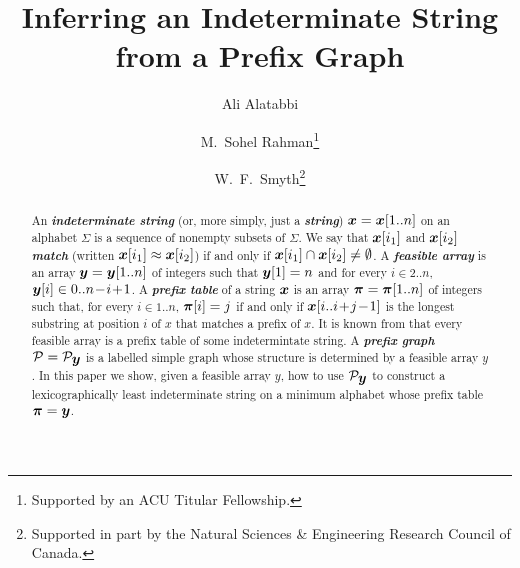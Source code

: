 \documentclass[runningheads,a4paper]{llncs}
\def\s#1{\mbox{\boldmath $#1$}}
\def\+{\!+\!}
\def\-{\!-\!}
\def\itbf#1{\textit{\textbf{#1}}}
\def\match{\approx}
\begin{document}
\pagestyle{headings}


\title {Inferring an Indeterminate String \\ from a Prefix Graph}
 
\author{
Ali Alatabbi
\and
M.\ Sohel Rahman\thanks{Supported by an ACU Titular Fellowship.}
\and
W.\ F.\ Smyth\thanks{Supported in part by the Natural Sciences \& Engineering
Research Council of Canada.}}




\maketitle

\begin{abstract}
An \itbf{indeterminate string} (or, more simply, just a \itbf{string})
$\s{x} = \s{x}[1..n]$ on an alphabet $\Sigma$
is a sequence of nonempty subsets of $\Sigma$.
We say that $\s{x}[i_1]$ and $\s{x}[i_2]$ \itbf{match}
(written $\s{x}[i_1] \match \s{x}[i_2]$) if and only if
$\s{x}[i_1] \cap \s{x}[i_2] \ne \emptyset$.
A \itbf{feasible array} is an array $\s{y} = \s{y}[1..n]$ of integers
such that $\s{y}[1] = n$ and for every $i \in 2..n$,
$\s{y}[i] \in 0..n\- i\+ 1$.
A \itbf{prefix table} of a string $\s{x}$ is an array $\s{\pi} = \s{\pi}[1..n]$
of integers such that, for every $i \in 1..n$,
$\s{\pi}[i] = j$ if and only if $\s{x}[i..i\+ j\- 1]$
is the longest substring at position $i$ of \s{x} that matches a prefix of \s{x}.
It is known from \cite{CRSW13} that every feasible array is a prefix table of
some indetermintate string.
A \itbf{prefix graph} $\mathcal{P} = \mathcal{P}_{\s{y}}$
is a labelled simple graph whose structure is determined
by a feasible array \s{y}.
In this paper we show, given a feasible array \s{y},
how to use $\mathcal{P}_{\s{y}}$ to construct
a lexicographically least indeterminate string
on a minimum alphabet whose prefix table $\s{\pi} = \s{y}$.
\end{abstract}
\end{document}
